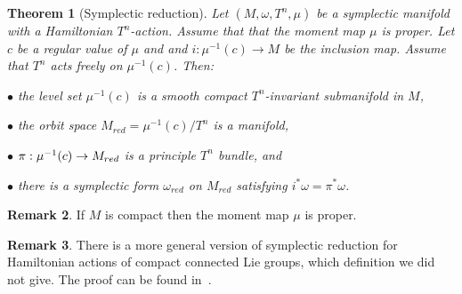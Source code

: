 \documentclass[jsg]{IP_v1_forauthors}
\newtheorem{theo}{Theorem}[section]
\theoremstyle{definition}
\newtheorem{rema}[theo]{Remark}
\numberwithin{equation}{section}
\begin{document}
\begin{theo}[Symplectic reduction]
Let $(M,\omega,T^n,\mu)$ be a symplectic manifold with a Hamiltonian $T^n$-action. Assume that that the moment map $\mu$ is proper. Let $c$ be a regular value of $\mu$ and and $i:\mu^{-1} (c) \rightarrow M$ be the inclusion map. Assume that $T^n$ acts freely on $\mu^{-1}(c)$. Then:

\medskip

\noindent $\bullet$ the level set $\mu^{-1}(c)$ is a smooth compact $T^n$-invariant submanifold in $M$,

\medskip

\noindent $\bullet$ the orbit space $M_{red}=\mu^{-1}(c) / T^n$ is a manifold,

\medskip

\noindent $\bullet$ $\pi : \noindent \mu^{-1}(c) \rightarrow M_{red}$ is a principle $T^n$ bundle, and

\medskip

\noindent $\bullet$ there is a symplectic form $\omega_{red}$ on $M_{red}$ satisfying $i^* \omega = \pi ^* \omega$.
\end{theo}
\begin{rema}
If $M$ is compact then the moment map $\mu$ is proper.
\end{rema}
\begin{rema}
There is a more general version of symplectic reduction for Hamiltonian actions of compact connected Lie groups, which definition we did not give. The proof can be found in~\cite{MW}.
\end{rema}
\end{document}
